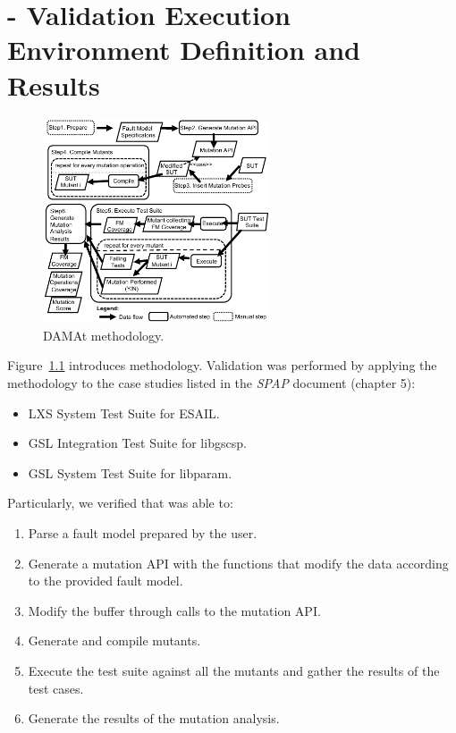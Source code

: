 
\chapter{\DAMA - Validation Execution Environment Definition and Results}

\begin{figure}[h]
  \centering
  \includegraphics[width=0.6\textwidth]{images/dataDrivenBufferProcess.pdf}
      \caption{DAMAt methodology.}
      \label{fig:damat}
\end{figure}

Figure~\ref{fig:damat} introduces \DAMA methodology.
Validation was performed by applying the \DAMA methodology to the case studies listed in the \emph{SPAP} document (chapter 5):
\begin{itemize}
  \item LXS System Test Suite for ESAIL.
  \item GSL Integration Test Suite for libgscsp.
  \item GSL System Test Suite for libparam.
\end{itemize}

Particularly, we verified that \DAMA was able to:
\begin{enumerate}
	\item Parse a fault model prepared by the user.
	\item Generate a mutation API with the functions that modify the data according to the provided fault model.
  \item Modify the buffer through calls to the mutation API.
	\item Generate and compile mutants.
	\item Execute the test suite against all the mutants and gather the results of the test cases.
	\item Generate the results of the mutation analysis.
\end{enumerate}

